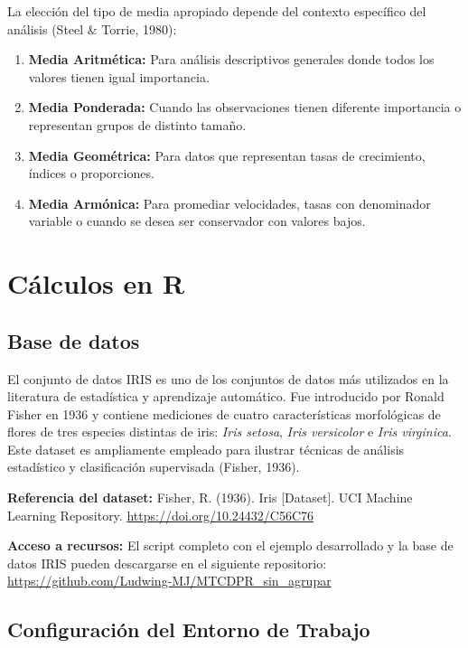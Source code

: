 \documentclass[
  spanish,
  letterpaper,
]{book}
\begin{document}
La elección del tipo de media apropiado depende del contexto específico
del análisis (Steel \& Torrie, 1980):

\begin{enumerate}
\def\labelenumi{\arabic{enumi}.}
\item
  \textbf{Media Aritmética:} Para análisis descriptivos generales donde
  todos los valores tienen igual importancia.
\item
  \textbf{Media Ponderada:} Cuando las observaciones tienen diferente
  importancia o representan grupos de distinto tamaño.
\item
  \textbf{Media Geométrica:} Para datos que representan tasas de
  crecimiento, índices o proporciones.
\item
  \textbf{Media Armónica:} Para promediar velocidades, tasas con
  denominador variable o cuando se desea ser conservador con valores
  bajos.
\end{enumerate}


\chapter{Cálculos en R}\label{cuxe1lculos-en-r}

\section{Base de datos}\label{base-de-datos}

El conjunto de datos IRIS es uno de los conjuntos de datos más
utilizados en la literatura de estadística y aprendizaje automático. Fue
introducido por Ronald Fisher en 1936 y contiene mediciones de cuatro
características morfológicas de flores de tres especies distintas de
iris: \emph{Iris setosa}, \emph{Iris versicolor} e \emph{Iris
virginica}. Este dataset es ampliamente empleado para ilustrar técnicas
de análisis estadístico y clasificación supervisada (Fisher, 1936).

\textbf{Referencia del dataset:} Fisher, R. (1936). Iris {[}Dataset{]}.
UCI Machine Learning Repository. \url{https://doi.org/10.24432/C56C76}

\textbf{Acceso a recursos:} El script completo con el ejemplo
desarrollado y la base de datos IRIS pueden descargarse en el siguiente
repositorio: \url{https://github.com/Ludwing-MJ/MTCDPR_sin_agrupar}

\section{Configuración del Entorno de
Trabajo}\label{configuraciuxf3n-del-entorno-de-trabajo}
\end{document}
